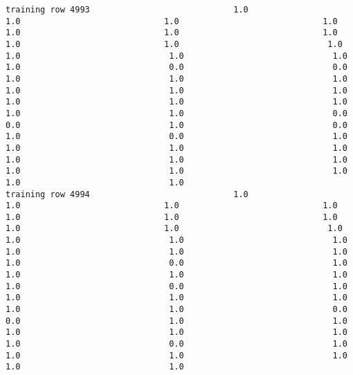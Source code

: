\documentclass[11pt]{article}
\begin{document}
\begin{verbatim}
training row 4993                             1.0                             1.0                             1.0                             1.0                             1.0                             1.0                             1.0                             1.0                             1.0                              1.0                              1.0                              1.0                              1.0                              1.0                              0.0                              0.0                              1.0                              1.0                              1.0                              1.0                              1.0                              1.0                              1.0                              1.0                              1.0                              1.0                              1.0                              0.0                              0.0                              1.0                              0.0                              1.0                              0.0                              1.0                              1.0                              1.0                              1.0                              1.0                              1.0                              1.0                              1.0                              1.0                              1.0                              1.0                              1.0
training row 4994                             1.0                             1.0                             1.0                             1.0                             1.0                             1.0                             1.0                             1.0                             1.0                              1.0                              1.0                              1.0                              1.0                              1.0                              1.0                              1.0                              1.0                              0.0                              1.0                              1.0                              1.0                              1.0                              1.0                              0.0                              1.0                              1.0                              1.0                              1.0                              1.0                              1.0                              0.0                              0.0                              1.0                              1.0                              1.0                              1.0                              1.0                              1.0                              0.0                              1.0                              1.0                              1.0                              1.0                              1.0                              1.0

\end{verbatim}
\end{document}
